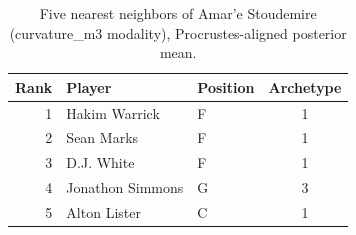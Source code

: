 \begin{table}[htbp]
  \centering\small
  \begin{tabular}{rllc}
    \toprule
    Rank & Player & Position & Archetype \\
    \midrule
    1 & Hakim Warrick & F & 1 \\
    2 & Sean Marks & F & 1 \\
    3 & D.J. White & F & 1 \\
    4 & Jonathon Simmons & G & 3 \\
    5 & Alton Lister & C & 1 \\
    \bottomrule
  \end{tabular}
  \caption{Five nearest neighbors of Amar'e Stoudemire (curvature_m3 modality), Procrustes-aligned posterior mean.}
  \label{tab:Amar_e_Stoudemire_neighbors_curvature_m3}
\end{table}

